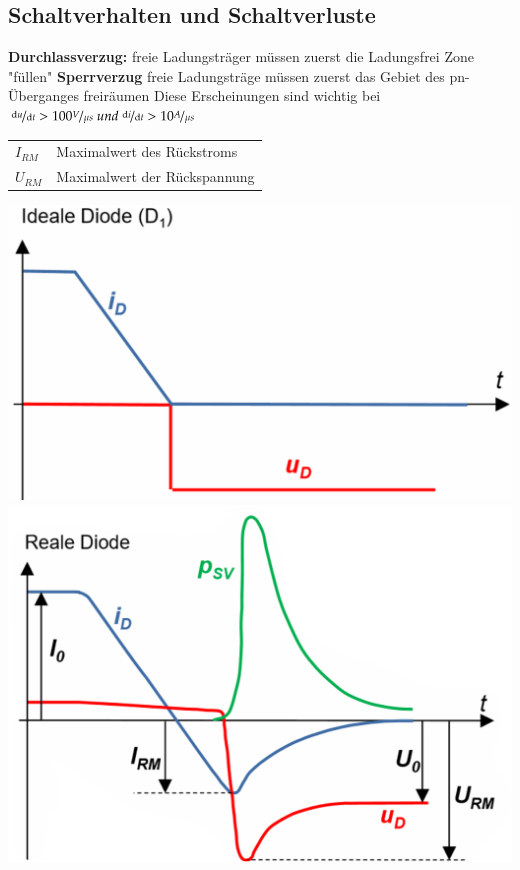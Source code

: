 \subsection{Schaltverhalten und Schaltverluste}
    \begin{minipage}{0.7\linewidth}
        \raggedright
        \textbf{Durchlassverzug:}\newline
        freie Ladungsträger müssen zuerst die Ladungsfrei Zone "füllen"\newline\newline
        \textbf{Sperrverzug}\newline
        freie Ladungsträge müssen zuerst das Gebiet des pn-Überganges freiräumen\newline\newline
        Diese Erscheinungen sind wichtig bei  $\nicefrac{\mathop{}\!\mathrm{d} u}{\mathop{}\!\mathrm{d} t} > 100 \nicefrac{V}{\mu s} \; und \; \nicefrac{\mathop{}\!\mathrm{d} i}{\mathop{}\!\mathrm{d} t} > 10 \nicefrac{A}{\mu s} $
        \begin{tabular}{ll}
            $ I_{RM} $&Maximalwert des Rückstroms\\
            $ U_{RM} $&Maximalwert der Rückspannung\\
        \end{tabular}
    \end{minipage}   
    \begin{minipage}{0.3\linewidth}
        \vspace{-0.8cm}
        \raggedleft
            \includegraphics[width=\linewidth]{images/idealeDiodeSS}           
            \includegraphics[width=\linewidth]{images/realeDiodeSS}
    \end{minipage}
\clearpage

